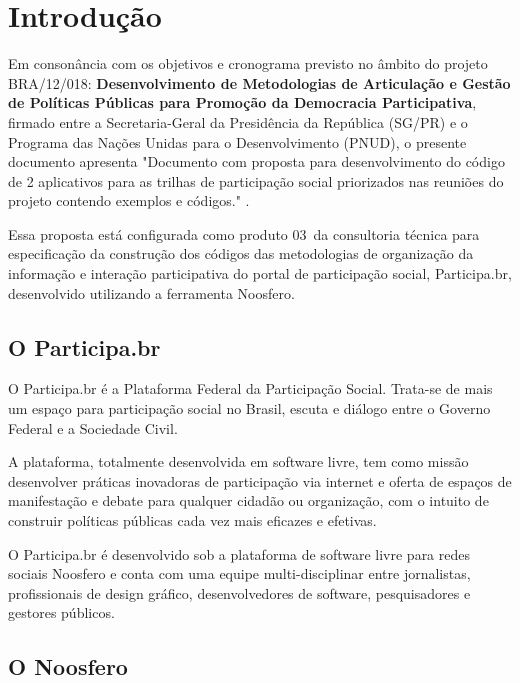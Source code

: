 \documentclass[12pt]{article}
\newcommand{\ProductNumber}{03}
\newcommand{\ProductDescription}{"Documento com proposta para desenvolvimento
  do código de 2 aplicativos para as trilhas de participação social
  priorizados nas reuniões do projeto contendo exemplos e códigos."
}
\newcommand{\PalavrasChave}{palavra1, palavra2, palavra3, etc}
\begin{document}



\tableofcontents
\newpage

\begin{abstract}
Resumo... \\

{\bf Palavras-chave:} \PalavrasChave.
\end{abstract}
\newpage

\section{Introdução}

Em consonância com os objetivos e cronograma previsto no âmbito do
projeto BRA/12/018:
\textbf{Desenvolvimento de Metodologias de Articulação e Gestão de
Políticas Públicas para Promoção da Democracia Participativa},
firmado entre a Secretaria-Geral da Presidência da República
(SG/PR) e o Programa das Nações Unidas para o Desenvolvimento (PNUD),
o presente documento apresenta \ProductDescription.

Essa proposta está configurada como produto \ProductNumber~da consultoria técnica
para especificação da construção dos códigos das metodologias de
organização da informação e interação participativa do portal de
participação social, Participa.br, desenvolvido utilizando a ferramenta
Noosfero.

\subsection{O Participa.br}

O Participa.br é a Plataforma Federal da Participação Social. Trata-se de mais
um espaço para participação social no Brasil, escuta e diálogo entre o Governo
Federal e a Sociedade Civil. 

A plataforma, totalmente desenvolvida em software livre, tem como missão
desenvolver práticas inovadoras de participação via internet e oferta de
espaços de manifestação e debate para qualquer cidadão ou organização, com o
intuito de construir políticas públicas cada vez mais eficazes e efetivas.

O Participa.br é desenvolvido sob a plataforma de software livre para redes
sociais Noosfero e conta com uma equipe multi-disciplinar entre jornalistas,
profissionais de design gráfico, desenvolvedores de software, pesquisadores e
gestores públicos.

\subsection{O Noosfero}
\end{document}
